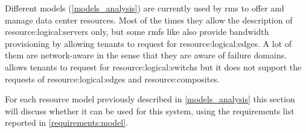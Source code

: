 Different \glspl{model} (\autoref{models_analysis}) are currently used by \glspl{rm} to offer and manage data center resources.
Most of the times they allow the description of \glspl{resource:logical:server} only, but some \glspl{rmf} like \cite{kraken, cloudmirror, oktopus} also provide bandwidth provisioning by allowing tenants to request for \glspl{resource:logical:edge}.
A lot of them are network-aware in the sense that they are aware of failure domains.
\cite{ontackling} allows tenants to request for \glspl{resource:logical:switch} but it does not support the requests of \glspl{resource:logical:edge} and \glspl{resource:composite}.

For each resource model previously described in \autoref{models_analysis} this section will discuss whether it can be used for this system, using the requirements list reported in \autoref{requirements:model}.